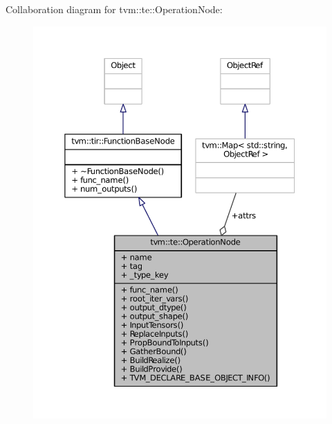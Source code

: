 Collaboration diagram for tvm\+:\+:te\+:\+:Operation\+Node\+:
\nopagebreak
\begin{figure}[H]
\begin{center}
\leavevmode
\includegraphics[width=350pt]{classtvm_1_1te_1_1OperationNode__coll__graph}
\end{center}
\end{figure}
